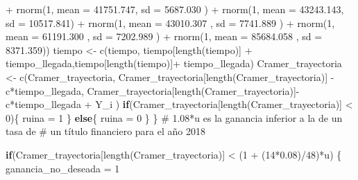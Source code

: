 \documentclass[
  us-letterpaper,
]{scrreprt}
\newenvironment{Shaded}{\begin{snugshade}}{\end{snugshade}}
\newcommand{\AttributeTok}[1]{\textcolor[rgb]{0.40,0.45,0.13}{#1}}
\newcommand{\CommentTok}[1]{\textcolor[rgb]{0.37,0.37,0.37}{#1}}
\newcommand{\ControlFlowTok}[1]{\textcolor[rgb]{0.00,0.23,0.31}{\textbf{#1}}}
\newcommand{\DecValTok}[1]{\textcolor[rgb]{0.68,0.00,0.00}{#1}}
\newcommand{\FloatTok}[1]{\textcolor[rgb]{0.68,0.00,0.00}{#1}}
\newcommand{\FunctionTok}[1]{\textcolor[rgb]{0.28,0.35,0.67}{#1}}
\newcommand{\NormalTok}[1]{\textcolor[rgb]{0.00,0.23,0.31}{#1}}
\newcommand{\OtherTok}[1]{\textcolor[rgb]{0.00,0.23,0.31}{#1}}
\newcommand{\SpecialCharTok}[1]{\textcolor[rgb]{0.37,0.37,0.37}{#1}}
\theoremstyle{plain}
\theoremstyle{plain}
\theoremstyle{definition}
\theoremstyle{remark}
\begin{document}
\begin{Shaded}
\begin{Highlighting}[]
              \SpecialCharTok{+} \FunctionTok{rnorm}\NormalTok{(}\DecValTok{1}\NormalTok{, }\AttributeTok{mean =}   \FloatTok{41751.747}\NormalTok{, }\AttributeTok{sd =} \FloatTok{5687.030}\NormalTok{ ) }
              \SpecialCharTok{+} \FunctionTok{rnorm}\NormalTok{(}\DecValTok{1}\NormalTok{, }\AttributeTok{mean =}   \FloatTok{43243.143}\NormalTok{, }\AttributeTok{sd =} \FloatTok{10517.841}\NormalTok{) }
              \SpecialCharTok{+} \FunctionTok{rnorm}\NormalTok{(}\DecValTok{1}\NormalTok{, }\AttributeTok{mean =} \FloatTok{43010.307}\NormalTok{  , }\AttributeTok{sd =} \FloatTok{7741.889}\NormalTok{ ) }
              \SpecialCharTok{+} \FunctionTok{rnorm}\NormalTok{(}\DecValTok{1}\NormalTok{, }\AttributeTok{mean =} \FloatTok{61191.300}\NormalTok{  , }\AttributeTok{sd =} \FloatTok{7202.989}\NormalTok{ ) }
              \SpecialCharTok{+} \FunctionTok{rnorm}\NormalTok{(}\DecValTok{1}\NormalTok{, }\AttributeTok{mean =}  \FloatTok{85684.058}\NormalTok{ , }\AttributeTok{sd =} \FloatTok{8371.359}\NormalTok{)) }
\NormalTok{    tiempo }\OtherTok{\textless{}{-}} \FunctionTok{c}\NormalTok{(tiempo, tiempo[}\FunctionTok{length}\NormalTok{(tiempo)] }\SpecialCharTok{+} 
\NormalTok{                  tiempo\_llegada,tiempo[}\FunctionTok{length}\NormalTok{(tiempo)]}\SpecialCharTok{+} 
\NormalTok{                  tiempo\_llegada) }
\NormalTok{    Cramer\_trayectoria }\OtherTok{\textless{}{-}} \FunctionTok{c}\NormalTok{(Cramer\_trayectoria,}
\NormalTok{    Cramer\_trayectoria[}\FunctionTok{length}\NormalTok{(Cramer\_trayectoria)] }\SpecialCharTok{{-}} 
\NormalTok{      c}\SpecialCharTok{*}\NormalTok{tiempo\_llegada, }
\NormalTok{    Cramer\_trayectoria[}\FunctionTok{length}\NormalTok{(Cramer\_trayectoria)]}\SpecialCharTok{{-}} 
\NormalTok{      c}\SpecialCharTok{*}\NormalTok{tiempo\_llegada }\SpecialCharTok{+}\NormalTok{  Y\_i )}
    \ControlFlowTok{if}\NormalTok{(Cramer\_trayectoria[}\FunctionTok{length}\NormalTok{(Cramer\_trayectoria)] }\SpecialCharTok{\textless{}} \DecValTok{0}\NormalTok{)\{}
\NormalTok{      ruina }\OtherTok{=} \DecValTok{1}
\NormalTok{    \}}
    \ControlFlowTok{else}\NormalTok{\{}
\NormalTok{      ruina }\OtherTok{=} \DecValTok{0}
\NormalTok{    \}}
\NormalTok{  \}}
\CommentTok{\# 1.08*u es la ganancia inferior a la de un tasa de }
\CommentTok{\# un título financiero  para el año 2018}
  
  \ControlFlowTok{if}\NormalTok{(Cramer\_trayectoria[}\FunctionTok{length}\NormalTok{(Cramer\_trayectoria)] }\SpecialCharTok{\textless{}}\NormalTok{ (}\DecValTok{1} \SpecialCharTok{+}\NormalTok{ (}\DecValTok{14}\SpecialCharTok{*}\FloatTok{0.08}\NormalTok{)}\SpecialCharTok{/}\DecValTok{48}\NormalTok{)}\SpecialCharTok{*}\NormalTok{u) \{}
\NormalTok{    ganancia\_no\_deseada }\OtherTok{=} \DecValTok{1}
    

\end{Highlighting}
\end{Shaded}
\end{document}
